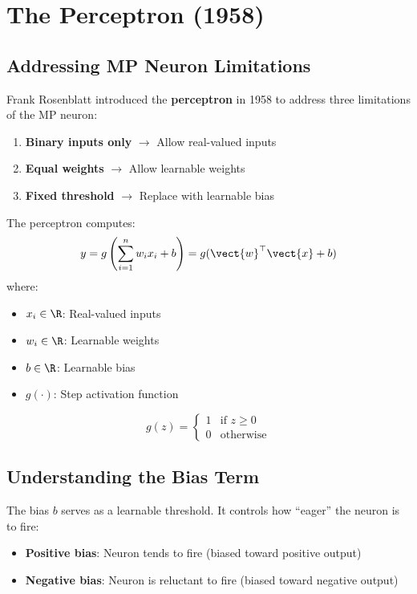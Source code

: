 \section{The Perceptron (1958)}

\subsection{Addressing MP Neuron Limitations}

Frank Rosenblatt introduced the \textbf{perceptron} in 1958 to address three limitations of the MP neuron:

\begin{enumerate}
    \item \textbf{Binary inputs only} $\rightarrow$ Allow real-valued inputs
    \item \textbf{Equal weights} $\rightarrow$ Allow learnable weights
    \item \textbf{Fixed threshold} $\rightarrow$ Replace with learnable bias
\end{enumerate}

\begin{definitionbox}
The perceptron computes:
\[
y = g\left(\sum_{i=1}^{n} w_i x_i + b\right) = g(\vect{w}^\top \vect{x} + b)
\]
where:
\begin{itemize}
    \item $x_i \in \R$: Real-valued inputs
    \item $w_i \in \R$: Learnable weights
    \item $b \in \R$: Learnable bias
    \item $g(\cdot)$: Step activation function
\end{itemize}
\[
g(z) = \begin{cases} 1 & \text{if } z \geq 0 \\ 0 & \text{otherwise} \end{cases}
\]
\end{definitionbox}

\subsection{Understanding the Bias Term}

The bias $b$ serves as a learnable threshold. It controls how ``eager'' the neuron is to fire:

\begin{itemize}
    \item \textbf{Positive bias}: Neuron tends to fire (biased toward positive output)
    \item \textbf{Negative bias}: Neuron is reluctant to fire (biased toward negative output)
\end{itemize}

